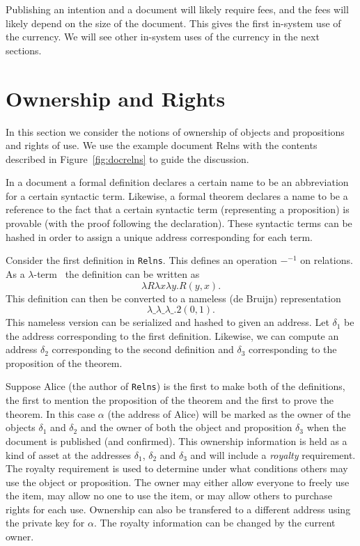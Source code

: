 \documentclass{article}
\begin{document}
Publishing an intention and a document will likely require fees,
and the fees will likely depend on the size of the document.
This gives the first in-system use of the currency.
We will see other in-system uses of the currency in the next sections.

\section{Ownership and Rights}\label{sec:rights}

In this section we consider the notions of ownership of objects and propositions
and rights of use.
We use the example document Relns with the contents
described in Figure~\ref{fig:docrelns} to guide the discussion.

In a document a formal definition declares a certain name to be an abbreviation for a certain syntactic term. Likewise, a formal theorem declares a name
to be a reference to the fact that a certain syntactic term (representing a proposition) is provable (with the proof following the declaration). These syntactic
terms can be hashed in order to assign a unique address corresponding for each
term.

Consider the first definition in {\tt{Relns}}.
This defines an operation $-^{-1}$ on relations.
As a $\lambda$-term~\cite{Church40} the definition can be written as
$$\lambda R\lambda x\lambda y.R(y,x).$$
This definition can then be converted to a nameless (de Bruijn) representation~\cite{deBruijn72}
$$\lambda \_\lambda \_\lambda \_.2(0,1).$$
This nameless version can be serialized and hashed to given an address.
Let $\delta_1$ be the address corresponding to the first definition.
Likewise, we can compute an address $\delta_2$ corresponding to the second definition
and $\delta_3$ corresponding to the proposition of the theorem.

Suppose Alice (the author of {\tt{Relns}})
is the first to make both of the definitions, the first to mention the proposition
of the theorem and the first to prove the theorem.
In this case $\alpha$ (the address of Alice)
will be marked as the owner of the objects $\delta_1$ and $\delta_2$
and the owner of both the object and proposition $\delta_3$
when the document is published (and confirmed).
This ownership information is held as a kind of asset at the addresses $\delta_1$, $\delta_2$
and $\delta_3$
and will include a {\em{royalty}} requirement.
The royalty requirement is used to determine under
what conditions others may use the object or proposition.
The owner may either allow everyone to freely use the item,
may allow no one to use the item,
or may allow others to purchase rights for each use.
Ownership can also be transfered to a different address using the private key for $\alpha$.
The royalty information can be changed by the current owner.
\end{document}

